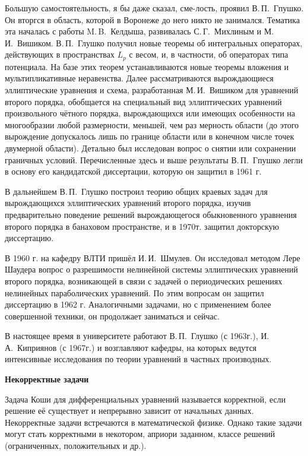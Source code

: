 Большую самостоятельность, я бы даже сказал,
сме-\linebreak лость,
проявил В.\,П.~Гпушко.
Он вторгся в область, которой в Воронеже до него никто не занимался. Тематика эта началась с работы M.\,B.~Келдыша, развивалась С.\,Г.~Михлиным и М.\,И.~Вишиком. В.\,П.~Глушко получил новые теоремы об интегральных операторах, действующих в пространствах  $L_p$ с весом, и, в частности, об операторах типа потенциала. На базе этих теорем устанавливаются новые теоремы вложения и мультипликативные неравенства. Далее рассматриваются вырождающиеся эллиптические уравнения и схема, разработанная М.\,И.~Вишиком для уравнений второго порядка, обобщается на специальный вид эллиптических уравнений произвольного чётного порядка, вырождающихся или имеющих особенности на многообразии любой размерности, меньшей, чем раз мерность области (до этого вырождение допускалось лишь по границе области или в конечном числе точек двумерной области). Детально был исследован вопрос о снятии или сохранении граничных условий. Перечисленные здесь и выше результаты В.\,П.~Гпушко легли в основу его кандидатской диссертации, которую он защитил в 1961 г.

В дальнейшем В.\,П.~Глушко построил теорию общих краевых задач для вырождающихся эллиптических уравнений второго порядка, изучив предварительно поведение решений вырождающегося обыкновенного уравнения второго порядка в банаховом пространстве, и в 1970т. защитил докторскую диссертацию.

В 1960 г. на кафедру ВЛТИ пришёл И.\,И.~Шмулев. Он исследовал методом Лере Шаудера вопрос о разрешимости нелинейной системы эллиптических уравнений второго порядка, возникающей в связи с задачей о периодических решениях нелинейных параболических уравнений. По этим вопросам он защитил диссертацию в 1962 г. Аналогичными задачами, но с применением более совершенной техники, он продолжает заниматься и сейчас.

В настоящее время в университете работают В.\,П.~Глушко (с 1963г.), И.\,А.~Киприянов (с 1967г.) и возглавляют кафедры, на которых ведутся интенсивные исследования по теории уравнений в частных производных.

{\bf Некорректные задачи}

Задача Коши для дифференциальных уравнений называется корректной, если решение её существует и непрерывно зависит от начальных данных. Некорректные задачи встречаются в математической физике. Однако такие задачи могут стать корректными в некотором, априори заданном, классе решений (ограниченных, положительных и др.).

